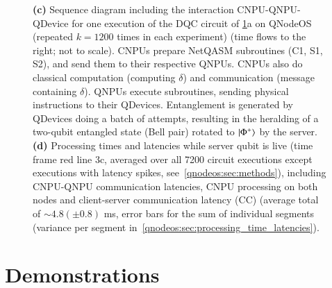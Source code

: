 \begin{figure}[htbp]
{\textbf{(c)} Sequence diagram including the interaction CNPU-QNPU-QDevice for one execution of the DQC circuit of \ref{fig:fig3}a on QNodeOS (repeated $k=1200$ times in each experiment) (time flows to the right; not to scale). CNPUs prepare NetQASM subroutines (C1, S1, S2), and send them to their respective QNPUs. CNPUs also do classical computation (computing $\delta$) and communication (message containing $\delta$). QNPUs execute subroutines, sending physical instructions to their QDevices. Entanglement is generated by QDevices doing a batch of attempts, resulting in the heralding of a two-qubit entangled state (Bell pair) rotated to $\ket{\Phi^+}$ by the server.
\textbf{(d)} Processing times and latencies while server qubit is live (time frame red line 3c, averaged over all 7200 circuit executions except executions with latency spikes, see~\cref{qnodeos:sec:methods}), including CNPU-QNPU communication latencies, CNPU processing on both nodes and client-server communication latency (CC) (average total of $\sim 4.8 (\pm 0.8)$ ms, error bars for the sum of individual segments (variance per segment in~\cref{qnodeos:sec:processing_time_latencies}).}
\label{fig:fig3}
\end{figure}


\section{Demonstrations}
